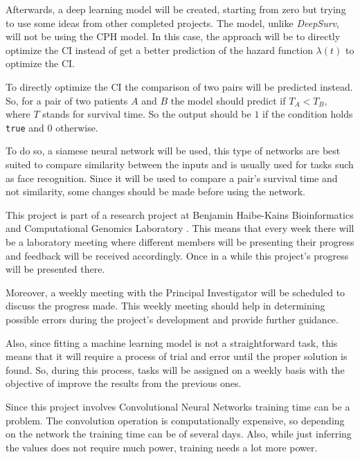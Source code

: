 Afterwards, a deep learning model will be created, starting from zero but trying to use some
ideas from other completed projects. The model, unlike \emph{DeepSurv}, will not be using
the \gls{CPH} model. In this case, the approach will be to directly optimize the \gls{CI}
instead of get a better prediction of the hazard function \( \lambda(t) \) to optimize 
the \gls{CI}.

To directly optimize the \gls{CI} the comparison of two pairs will be predicted instead. So,
for a pair of two patients \( A \) and \( B \) the model should predict if \( T_A < T_B \),
where \( T \) stands for survival time. So the output should be \( 1 \) if the condition holds
\texttt{true} and \( 0 \) otherwise.

To do so, a siamese neural network will be used,
this type of networks are best suited to compare similarity between the inputs and is usually
used for tasks such as face recognition. Since it will be used to compare a pair's survival
time and not similarity, some changes should be made before using the network.


This project is part of a research project at Benjamin Haibe-Kains Bioinformatics and 
Computational Genomics Laboratory \cite{bhklab}. This means that every week there will be a 
laboratory meeting where different members will be presenting their progress and feedback will
be received accordingly. Once in a while this project's progress will be presented there.

Moreover, a weekly meeting with the Principal Investigator will be scheduled to discuss
the progress made. This weekly meeting should help in determining possible errors during the 
project's development and provide further guidance.

Also, since fitting a machine learning model is not a straightforward task, this means that 
it will require a process of trial and error until the proper solution is found. 
So, during this process, tasks will be assigned on a weekly basis with the objective of
improve the results from the previous ones.



Since this project involves Convolutional Neural Networks training time can be a problem. 
The convolution operation is computationally expensive, so depending on the network the 
training time can be of several days. Also, while just inferring the values does not require
much power, training needs a lot more power. 

